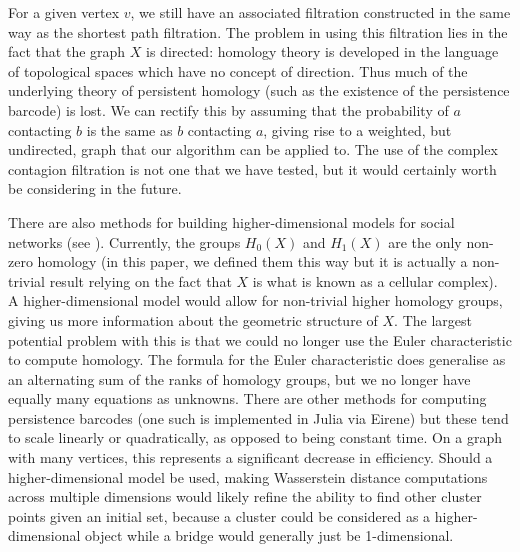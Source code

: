 \documentclass[12pt,a4paper]{amsart}
\numberwithin{equation}{section}
\theoremstyle{plain}
\theoremstyle{definition}
\begin{document}
For a given vertex $v$, we still have an associated filtration constructed in the same way as the shortest path filtration. The problem in using this filtration lies in the fact that the graph $X$ is directed: homology theory is developed in the language of topological spaces which have no concept of direction. Thus much of the underlying theory of persistent homology (such as the existence of the persistence barcode) is lost. We can rectify this by assuming that the probability of $a$ contacting $b$ is the same as $b$ contacting $a$, giving rise to a weighted, but undirected, graph that our algorithm can be applied to. The use of the complex contagion filtration is not one that we have tested, but it would certainly worth be considering in the future. 

There are also methods for building higher-dimensional models for social networks (see \cite{highdim}). Currently, the groups $H_0(X)$ and $H_1(X)$ are the only non-zero homology (in this paper, we defined them this way but it is actually a non-trivial result relying on the fact that $X$ is what is known as a cellular complex). A higher-dimensional model would allow for non-trivial higher homology groups, giving us more information about the geometric structure of $X$. The largest potential problem with this is that we could no longer use the Euler characteristic to compute homology. The formula for the Euler characteristic does generalise as an alternating sum of the ranks of homology groups, but we no longer have equally many equations as unknowns. There are other methods for computing persistence barcodes (one such is implemented in Julia via Eirene) but these tend to scale linearly or quadratically, as opposed to being constant time. On a graph with many vertices, this represents a significant decrease in efficiency. Should a higher-dimensional model be used, making Wasserstein distance computations across multiple dimensions would likely refine the ability to find other cluster points given an initial set, because a cluster could be considered as a higher-dimensional object while a bridge would generally just be 1-dimensional.



\newpage
\end{document}
